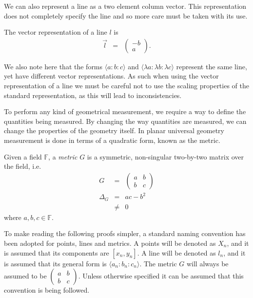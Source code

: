 We can also represent a line as a two element column vector.
This representation does not completely specify the line and so more care must be taken with its use.

\begin{definition} The vector representation of a line $l$ is
\begin{eqnarray}
\vec{l} & = & \begin{pmatrix} -b \\ a \end{pmatrix}.
\end{eqnarray}
\end{definition}

We also note here that the forms $\langle a\!:\!b\!:\!c \rangle$ and $\langle \lambda a\!:\! \lambda b\!:\! \lambda c \rangle$ represent the same line, yet have different vector representations.
As such when using the vector representation of a line we must be careful not to use the scaling properties of the standard representation, as this will lead to inconsistencies.

To perform any kind of geometrical measurement, we require a way to define the quantities being measured.
By changing the way quantities are measured, we can change the properties of the geometry itself.
In planar universal geometry measurement is done in terms of a quadratic form, known as the metric.

\begin{definition} Given a field $\mathbb{F}$, a \emph{metric} $G$ is a symmetric, non-singular two-by-two matrix over the field, i.e.
\begin{eqnarray}
G & = & \begin{pmatrix} a & b \\ b & c \end{pmatrix}\\
\Delta_G & = & ac - b^2\nonumber\\
 & \neq & 0
\end{eqnarray}
where $a, b, c \in \mathbb{F}$.
\end{definition}

To make reading the following proofs simpler, a standard naming convention has been adopted for points, lines and metrics.
A points will be denoted as $X_n$, and it is assumed that its components are $[x_n, y_n]$.
A line will be denoted as $l_n$, and it is assumed that its general form is $\langle a_n\!:\!b_n\!:\!c_n \rangle$.
The metric $G$ will always be assumed to be $\begin{pmatrix} a & b \\ b & c\end{pmatrix}$.
Unless otherwise specified it can be assumed that this convention is being followed.

